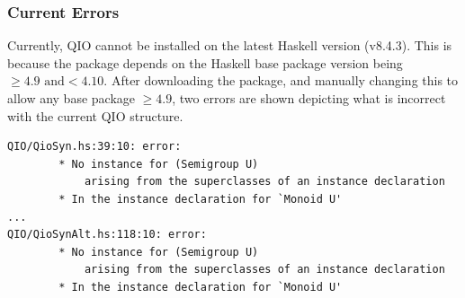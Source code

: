 \documentclass[a4paper,10pt, titlepage, twoside]{article}
\begin{document}
\subsubsection{Current Errors}
Currently, QIO cannot be installed on the latest Haskell version (v8.4.3). This is because the package depends on the Haskell base package version being $\geq 4.9 \text{ and} < 4.10$. After downloading the package, and manually changing this to allow any base package $\geq 4.9$, two errors are shown depicting what is incorrect with the current QIO structure.\par
\begin{verbatim}
QIO/QioSyn.hs:39:10: error:
        * No instance for (Semigroup U)
            arising from the superclasses of an instance declaration
        * In the instance declaration for `Monoid U'
...
QIO/QioSynAlt.hs:118:10: error:
        * No instance for (Semigroup U)
            arising from the superclasses of an instance declaration
        * In the instance declaration for `Monoid U'
\end{verbatim}
\end{document}

